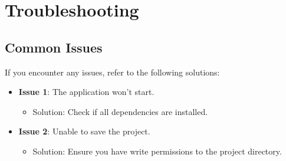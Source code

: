 \documentclass{book}
\begin{document}
\chapter{Troubleshooting}
\section{Common Issues}
If you encounter any issues, refer to the following solutions:

\begin{itemize}
    \item \textbf{Issue 1}: The application won't start.
    \begin{itemize}
        \item Solution: Check if all dependencies are installed.
    \end{itemize}
    \item \textbf{Issue 2}: Unable to save the project.
    \begin{itemize}
        \item Solution: Ensure you have write permissions to the project directory.
    \end{itemize}
\end{itemize}
\end{document}
